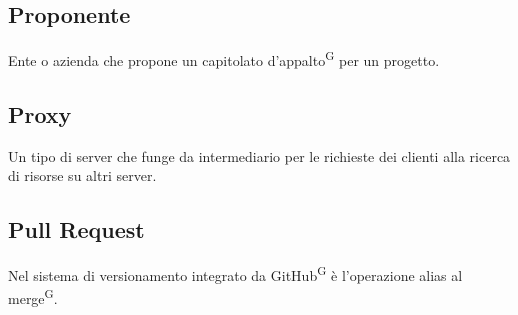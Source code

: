 \subsection{Proponente}
Ente o azienda che propone un capitolato d'appalto\textsuperscript{G} per un progetto.

\subsection{Proxy}
Un tipo di server che funge da intermediario per le richieste dei clienti alla ricerca di risorse su altri server.

\subsection{Pull Request}
Nel sistema di versionamento integrato da GitHub\textsuperscript{G} è l'operazione alias al merge\textsuperscript{G}.

\clearpage